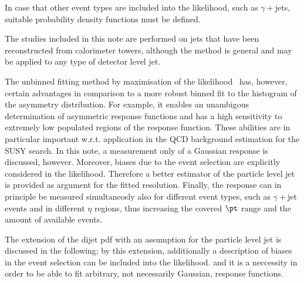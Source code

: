 In case that other event types are included into the likelihood, such as $\gamma+$jets, suitable probability density functions must be defined.

The studies included in this note are performed on jets that have been reconstructed from calorimeter towers, although the method is general and may be applied to any type of detector level jet.



The unbinned fitting method by maximisation of the
likelihood~ has, however, certain advantages in
comparison to a more robust binned fit to the histogram of the asymmetry distribution.
For example, it enables an unambigous
determination of asymmetric response functions  and has a high sensitivity to
extremely low populated regions of the response function.
These abilities are in particular important w.r.t. application in
the QCD background estimation for the SUSY search.
In this note, a measurement only of a Gaussian response is discussed,
however.
Moreover, biases due to the event selection are explicitly considered
in the likelihood.
Therefore a better estimator of the particle level jet \pt is provided
as argument for the fitted resolution.
Finally, the response can in principle be measured simultaneosly
also for different event types, such as $\gamma+$jet events and in different
$\eta$ regions, thus increasing the covered $\pt$ range and the amount
of available events.

The extension of the dijet pdf with an assumption for the particle
level jet \pt is discussed in the following; by this extension,
additionally a description of biases in the event selection can be
included into the likelihood. and it is a neccessity in order to be
able to fit arbitrary, not necessarily Gaussian, response functions.
